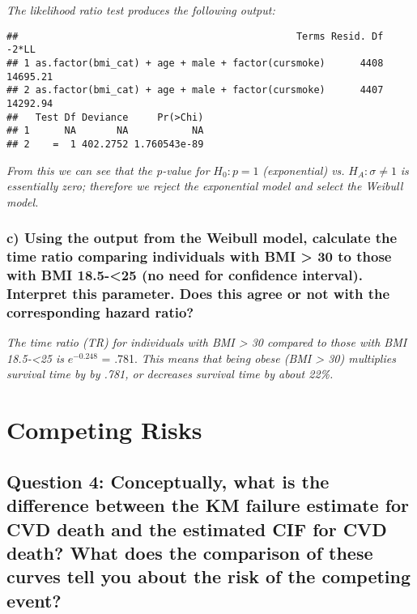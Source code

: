 \documentclass[]{article}
\begin{document}
\emph{The likelihood ratio test produces the following output:}

\begin{verbatim}
##                                                Terms Resid. Df    -2*LL
## 1 as.factor(bmi_cat) + age + male + factor(cursmoke)      4408 14695.21
## 2 as.factor(bmi_cat) + age + male + factor(cursmoke)      4407 14292.94
##   Test Df Deviance     Pr(>Chi)
## 1      NA       NA           NA
## 2    =  1 402.2752 1.760543e-89
\end{verbatim}

\emph{From this we can see that the p-value for} \(H_0 : p = 1\)
\emph{(exponential) vs.} \(H_A : \sigma \neq 1\) \emph{is essentially
zero; therefore we reject the exponential model and select the Weibull
model.}

\vspace{2pt}

\subsubsection{c) Using the output from the Weibull model, calculate the
time ratio comparing individuals with BMI \textgreater{} 30 to those
with BMI 18.5-\textless{}25 (no need for confidence interval). Interpret
this parameter. Does this agree or not with the corresponding hazard
ratio?}\label{c-using-the-output-from-the-weibull-model-calculate-the-time-ratio-comparing-individuals-with-bmi-30-to-those-with-bmi-18.5-25-no-need-for-confidence-interval.-interpret-this-parameter.-does-this-agree-or-not-with-the-corresponding-hazard-ratio}

\emph{The time ratio (TR) for individuals with BMI \textgreater{} 30
compared to those with BMI 18.5-\textless{}25 is} \(e^{-0.248}\) = .781.
\emph{This means that being obese (BMI \textgreater{} 30) multiplies
survival time by by .781, or decreases survival time by about 22\%.}

\vspace{2pt}

\section{Competing Risks}\label{competing-risks}

\subsection{Question 4: Conceptually, what is the difference between the
KM failure estimate for CVD death and the estimated CIF for CVD death?
What does the comparison of these curves tell you about the risk of the
competing
event?}\label{question-4-conceptually-what-is-the-difference-between-the-km-failure-estimate-for-cvd-death-and-the-estimated-cif-for-cvd-death-what-does-the-comparison-of-these-curves-tell-you-about-the-risk-of-the-competing-event}
\end{document}
